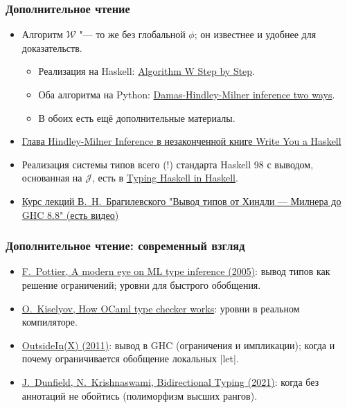 \documentclass[11pt]{beamer}
\newcommand{\J}{\mathcal{J}}
\begin{document}
\begin{frame}[fragile]
  \frametitle{Дополнительное чтение}
  \begin{itemize}
    \item Алгоритм $\mathcal{W}$ "--- то же без глобальной $\phi$; он известнее и удобнее для доказательств.
    \begin{itemize}
      \item Реализация на Haskell: \href{https://github.com/mgrabmueller/AlgorithmW}{Algorithm W Step by Step}.
      \item Оба алгоритма на Python: \href{https://bernsteinbear.com/blog/type-inference/}{Damas-Hindley-Milner inference two ways}.
      \item В обоих есть ещё дополнительные материалы.
    \end{itemize}
    \item \href{https://smunix.github.io/dev.stephendiehl.com/fun/006_hindley_milner.html}{Глава Hindley-Milner Inference в незаконченной книге Write You a Haskell}
    \item Реализация системы типов всего (!) стандарта Haskell 98 с выводом, основанная на $\J$, есть в \href{https://gist.github.com/chrisdone/0075a16b32bfd4f62b7b}{Typing Haskell in Haskell}.
    \item \href{https://compsciclub.ru/courses/types/2019-spring/classes/}{Курс лекций В.~Н.~Брагилевского "Вывод типов от Хиндли — Милнера до GHC 8.8"  (есть видео)}
  \end{itemize}
\end{frame}

\begin{frame}[fragile]
  \frametitle{Дополнительное чтение: современный взгляд}
  \begin{itemize}
    \item \href{https://cambium.inria.fr/~fpottier/publis/fpottier-appsem-2005.pdf}{F.~Pottier, A modern eye on ML type inference (2005)}: вывод типов как решение ограничений; уровни для быстрого обобщения.
    \item \href{https://okmij.org/ftp/ML/generalization.html}{O.~Kiselyov, How OCaml type checker works}: уровни в реальном компиляторе.
    \item \href{https://simon.peytonjones.org/outsideinx/}{OutsideIn(X) (2011)}: вывод в GHC (ограничения и импликации); когда и почему ограничивается обобщение локальных \haskinline|let|.
    \item \href{https://arxiv.org/abs/1908.05839}{J.~Dunfield, N.~Krishnaswami, Bidirectional Typing (2021)}: когда без аннотаций не обойтись (полиморфизм высших рангов).
  \end{itemize}
\end{frame}
\end{document}
